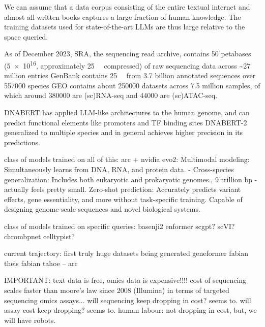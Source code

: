 We can assume that a data corpus consisting of the entire textual internet and almost all written books captures a large fraction of human knowledge. The training datasets used for state-of-the-art LLMs are thus large relative to the space queried.

As of December 2023, SRA, the sequencing read archive, contains 50 petabases (\SI{5e16}{\bp}, approximately \SI{25}{\peta\byte} compressed) of raw sequencing data across \textasciitilde 27 million entries GenBank contains \SI{25}{\tera\bp} from 3.7 billion annotated sequences over \num{557000} species GEO contains about \num{250000} datasets across 7.5 million samples, of which around \num{380000} are (sc)RNA-seq and \num{44000} are (sc)ATAC-seq.

DNABERT has applied LLM-like architectures to the human genome, and can predict functional elements like promoters and TF binding sites DNABERT-2 generalized to multiple species and in general achieves higher precision in its predictions.

class of models trained on all of this:
arc + nvidia evo2: Multimodal modeling: Simultaneously learns from DNA, RNA, and protein data. - Cross-species generalization: Includes both eukaryotic and prokaryotic genomes., 9 trillion bp - actually feels pretty small.  Zero-shot prediction: Accurately predicts variant effects, gene essentiality, and more without task-specific training. Capable of designing genome-scale sequences and novel biological systems.

class of models trained on specific queries:
basenji2
enformer
scgpt?
scVI?
chrombpnet
celltypist?


current trajectory: first truly huge datasets being generated
geneformer
fabian theis fabian 
tahoe -- arc

IMPORTANT: text data is free, omics data is expensive!!!!
cost of sequencing scales faster than moore's law since 2008 (Illumina)
in terms of targeted sequencing omics assays... will sequencing keep dropping in cost? seems to. will assay cost keep dropping? seems to. human labour: not dropping in cost, but, we will have robots. 

